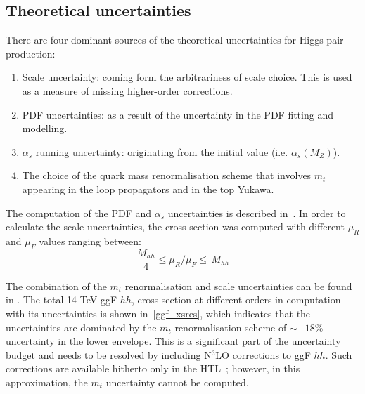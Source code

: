 \subsection{Theoretical uncertainties}
There are four dominant sources of the theoretical uncertainties for Higgs pair production:
\begin{enumerate}
	\item Scale uncertainty: coming form the arbitrariness of scale choice. This is used as a measure of missing higher-order corrections.
	\item PDF uncertainties: as a result of the uncertainty in the PDF fitting and modelling.
	\item $\alpha_s$ running uncertainty: originating from the initial value (i.e. $\alpha_s(M_Z) $).
	\item The choice of the quark mass renormalisation scheme that involves $m_t$ appearing in the loop propagators and in the top Yukawa.
\end{enumerate}
\par The computation of the PDF and $\alpha_s$ uncertainties is described in~\cite{Martin:2009bu, Demartin:2010er}.
In order to calculate the scale uncertainties, the cross-section was computed with different $ \mu_R$ and $\mu_F$ values ranging between:
\begin{equation}
	\frac{M_{hh}}{4} \leq \mu_R/\mu_F  \leq \,M_{hh}
\end{equation}
\par The combination of the $m_t$ renormalisation and scale uncertainties can be found in \cite{Baglio:2020wgt}.
The total 14 TeV ggF $hh$, cross-section at different orders in computation with its uncertainties is shown in~\autoref{ggf_xsres}, which indicates that the uncertainties are dominated by the $m_t$ renormalisation scheme of $\sim -18\%$ uncertainty in the lower envelope.  This is a significant part of the uncertainty budget and needs to be resolved by including N$^3$LO corrections to ggF $hh$. Such corrections are available hitherto only in the HTL~\cite{Chen:2019lzz,Chen:2019fhs}; however, in this approximation, the $m_t$ uncertainty cannot be computed.
%
